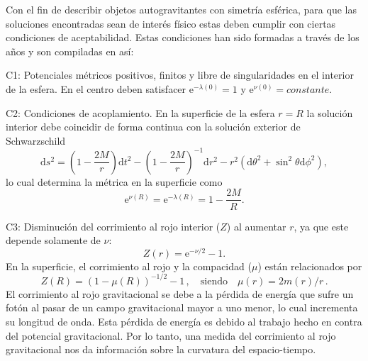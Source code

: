 \documentclass[letterpaper,11pt]{article}
\begin{document}
Con el fin de describir objetos autogravitantes con simetría esférica, para que las soluciones encontradas sean de interés físico estas deben cumplir con ciertas condiciones de aceptabilidad. Estas condiciones han sido formadas a través de los años y son compiladas en \cite{ivanov2017analytical} así:

C1: Potenciales métricos positivos, finitos y libre de singularidades en el interior de la esfera. En el centro deben satisfacer $\mathrm{e}^{-\lambda(0)}=1$ y $\mathrm{e}^{\nu(0)}=constante$.

C2: Condiciones de acoplamiento. En la superficie de la esfera $r=R$ la solución interior debe coincidir de forma continua con la solución exterior de Schwarzschild
\begin{equation*}
    \mathrm{d}s^{2} = \left(1 - \frac{2M}{r} \right)\mathrm{d}t^{2} - \left(1 - \frac{2M}{r} \right)^{-1}\mathrm{d}r^{2} - r^{2} \left(\mathrm{d}\theta^{2} + \sin^{2}{\theta} \mathrm{d}\phi^{2}  \right),
\end{equation*}
lo cual determina la métrica en la superficie como
\begin{equation*}
    \mathrm{e}^{\nu(R)} = \mathrm{e}^{-\lambda(R)} = 1 - \frac{2M}{R}.
\end{equation*}

C3: Disminución del corrimiento al rojo interior ($Z$) al aumentar $r$, ya que este depende solamente de $\nu$:
\begin{equation*}
    Z(r) = \mathrm{e}^{-\nu/2}-1.
\end{equation*}
En la superficie, el corrimiento al rojo y la compacidad ($\mu$) están relacionados por
\begin{equation*}
    Z(R) = \left(1 - \mu(R) \right)^{-1/2} - 1 \, , \quad  \text{siendo} \quad \mu(r) = 2m(r)/r \, .
\end{equation*}
El corrimiento al rojo gravitacional se debe a la pérdida de energía que sufre un fotón al pasar de un campo gravitacional mayor a uno menor, lo cual incrementa su longitud de onda. Esta pérdida de energía es debido al trabajo hecho en contra del potencial gravitacional. Por lo tanto, una medida del corrimiento al rojo gravitacional nos da información sobre la curvatura del espacio-tiempo.
\end{document}
